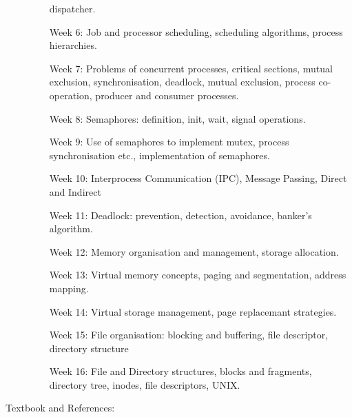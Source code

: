 \documentclass{wx672article} %
\begin{document}
\begin{description}
\begin{itemize}
    dispatcher.
  \item[Week 6:] Job and processor scheduling, scheduling algorithms, process hierarchies.
  \item[Week 7:] Problems of concurrent processes, critical sections, mutual exclusion,
    synchronisation, deadlock, mutual exclusion, process co-operation, producer and
    consumer processes.
  \item[Week 8:] Semaphores: definition, init, wait, signal operations.
  \item[Week 9:] Use of semaphores to implement mutex, process synchronisation etc.,
    implementation of semaphores.
  \item[Week 10:] Interprocess Communication (IPC), Message Passing, Direct and Indirect
  \item[Week 11:] Deadlock: prevention, detection, avoidance, banker's algorithm.
  \item[Week 12:] Memory organisation and management, storage allocation.
  \item[Week 13:] Virtual memory concepts, paging and segmentation, address mapping.
  \item[Week 14:] Virtual storage management, page replacemant strategies.
  \item[Week 15:] File organisation: blocking and buffering, file descriptor, directory
    structure
  \item[Week 16:] File and Directory structures, blocks and fragments, directory tree,
    inodes, file descriptors, UNIX.
  \end{itemize}
\item[Textbook and References:]\hfill
  \nocite{silberschatz11essentials,tanenbaum2008modern,bovet2005understanding}
  \printbibliography[heading=none]{}
\end{description}
\end{document}
